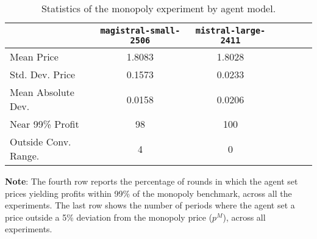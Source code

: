 \begin{table}[H]
\centering
\caption{Statistics of the monopoly experiment by agent model.}
\label{tab:monopoly_stats}
\begin{tabular}{lcccccc}
\toprule
 & \texttt{magistral-small-2506} & \texttt{mistral-large-2411} \\
\midrule
Mean Price & 1.8083 & 1.8028 \\
Std. Dev. Price & 0.1573 & 0.0233 \\
Mean Absolute Dev. & 0.0158 & 0.0206 \\
Near 99\% Profit & 98 & 100 \\
Outside Conv. Range. & 4 & 0 \\
\bottomrule
\end{tabular}

\vspace{0.5em}
\footnotesize{\parbox{1\textwidth}{\textbf{Note}: The fourth row reports the percentage of rounds in which the agent set prices yielding profits within 99\% of the monopoly benchmark, across all the experiments. The last row shows the number of periods where the agent set a price outside a 5\% deviation from the monopoly price ($p^M$), across all experiments.}}

\end{table}
